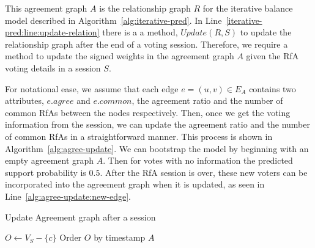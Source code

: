 This agreement graph $A$ is the relationship graph $R$ for the iterative balance model described in Algorithm~\ref{alg:iterative-pred}. 
In Line~\ref{iterative-pred:line:update-relation} there is a a method, $Update(R,S)$ to update the relationship graph after the end of a voting session.
Therefore, we require a method to update the signed weights in the agreement graph $A$ given the RfA voting details in a session $S$.

For notational ease, we assume that each edge $e = (u,v) \in E_{A}$ contains two attributes, $e.agree$ and $e.common$, the agreement ratio and the number of common RfAs between the nodes respectively.
Then, once we get the voting information from the session, we can update the agreement ratio and the number of common RfAs in a straightforward manner.
This process is shown in Algorithm~\ref{alg:agree-update}.
We can bootstrap the model by beginning with an empty agreement graph $A$.
Then for votes with no information the predicted support probability is $0.5$.
After the RfA session is over, these new voters can be incorporated into the agreement graph when it is updated, as seen in Line~\ref{alg:agree-update:new-edge}.

\begin{algorithm}[H]
    \DontPrintSemicolon
    \caption{Update Agreement graph after a session}
    \label{alg:agree-update}
    $O \leftarrow V_{S}-\{c\}$\;
    Order $O$ by timestamp\;
    \Return $A$
\end{algorithm}

